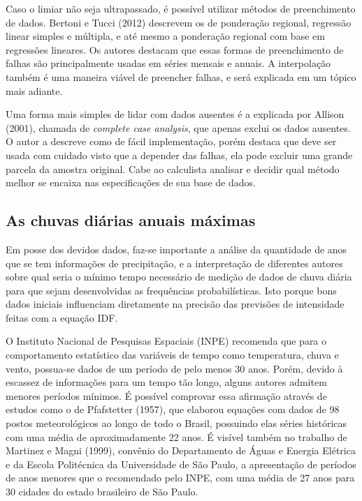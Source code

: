 Caso o limiar não seja ultrapassado, é possível utilizar métodos de preenchimento de dados. Bertoni e Tucci (2012) descrevem os de ponderação regional, regressão linear simples e múltipla, e até mesmo a ponderação regional com base em regressões lineares. Os autores destacam que essas formas de preenchimento de falhas são principalmente usadas em séries mensais e anuais. A interpolação também é uma maneira viável de preencher falhas, e será explicada em um tópico mais adiante.

Uma forma mais simples de lidar com dados ausentes é a explicada por Allison (2001), chamada de \textit{complete case analysis}, que apenas exclui os dados ausentes. O autor a descreve como de fácil implementação, porém destaca que deve ser usada com cuidado visto que a depender das falhas, ela pode excluir uma grande parcela da amostra original. Cabe ao calculista analisar e decidir qual método melhor se encaixa nas especificações de sua base de dados.

\subsection{As chuvas diárias anuais máximas}

Em posse dos devidos dados, faz-se importante a análise da quantidade de anos que se tem informações de precipitação, e a interpretação de diferentes autores sobre qual seria o mínimo tempo necessário de medição de dados de chuva diária para que sejam desenvolvidas as frequências probabilísticas. Isto porque bons dados iniciais influenciam diretamente na precisão das previsões de intensidade feitas com a equação IDF.

O Instituto Nacional de Pesquisas Espaciais (INPE) recomenda que para o comportamento estatístico das variáveis de tempo como temperatura, chuva e vento, possua-se dados de um período de pelo menos 30 anos. Porém, devido à escassez de informações para um tempo tão longo, alguns autores admitem menores períodos mínimos. É possível comprovar essa afirmação através de estudos como o de Pfafstetter (1957), que elaborou equações com dados de 98 postos meteorológicos ao longo de todo o Brasil, possuindo elas séries históricas com uma média de aproximadamente 22 anos. É visível também no trabalho de Martinez e Magni (1999), convênio do Departamento de Águas e Energia Elétrica e da Escola Politécnica da Universidade de São Paulo, a apresentação de períodos de anos menores que o recomendado pelo INPE, com uma média de 27 anos para 30 cidades do estado brasileiro de São Paulo.

